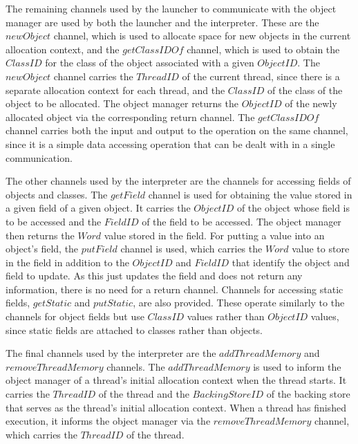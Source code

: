 The remaining channels used by the launcher to communicate with the
object manager are used by both the launcher and the interpreter.
These are the $newObject$ channel, which is used to allocate space for
new objects in the current allocation context, and the $getClassIDOf$
channel, which is used to obtain the $ClassID$ for the class of the
object associated with a given $ObjectID$.
The $newObject$ channel carries the $ThreadID$ of the current thread,
since there is a separate allocation context for each thread, and the
$ClassID$ of the class of the object to be allocated.
The object manager returns the $ObjectID$ of the newly allocated
object via the corresponding return channel.
The $getClassIDOf$ channel carries both the input and output to the
operation on the same channel, since it is a simple data accessing
operation that can be dealt with in a single communication.

The other channels used by the interpreter are the channels for
accessing fields of objects and classes.
The $getField$ channel is used for obtaining the value stored in a
given field of a given object.
It carries the $ObjectID$ of the object whose field is to be accessed
and the $FieldID$ of the field to be accessed.
The object manager then returns the $Word$ value stored in the field.
For putting a value into an object's field, the $putField$ channel is
used, which carries the $Word$ value to store in the field in addition
to the $ObjectID$ and $FieldID$ that identify the object and field to
update.
As this just updates the field and does not return any information,
there is no need for a return channel.
Channels for accessing static fields, $getStatic$ and $putStatic$, are
also provided.
These operate similarly to the channels for object fields but use
$ClassID$ values rather than $ObjectID$ values, since static fields are
attached to classes rather than objects.

The final channels used by the interpreter are the $addThreadMemory$
and $removeThreadMemory$ channels.
The $addThreadMemory$ is used to inform the object manager of a
thread's initial allocation context when the thread starts.
It carries the $ThreadID$ of the thread and the $BackingStoreID$ of
the backing store that serves as the thread's initial allocation
context.
When a thread has finished execution, it informs the object manager
via the $removeThreadMemory$ channel, which carries the $ThreadID$ of
the thread.

